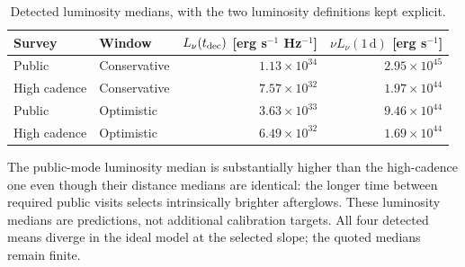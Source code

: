 \begin{table}[H]\centering\small
\renewcommand{\arraystretch}{1.15}
\caption{Detected luminosity medians, with the two luminosity definitions kept explicit.}
\begin{tabular}{@{}llrr@{}}
\toprule
Survey & Window & $L_\nu(t_{\rm dec})$ [erg s$^{-1}$ Hz$^{-1}$] & $\nu L_\nu(1\,\mathrm{d})$ [erg s$^{-1}$] \\\midrule
Public & Conservative & $1.13\times10^{34}$ & $2.95\times10^{45}$ \\
High cadence & Conservative & $7.57\times10^{32}$ & $1.97\times10^{44}$ \\
Public & Optimistic & $3.63\times10^{33}$ & $9.46\times10^{44}$ \\
High cadence & Optimistic & $6.49\times10^{32}$ & $1.69\times10^{44}$ \\
\bottomrule\end{tabular}\end{table}

The public-mode luminosity median is substantially higher than the high-cadence
one even though their distance medians are identical: the longer time between
required public visits selects intrinsically brighter afterglows. These
luminosity medians are predictions, not additional calibration targets.
All four detected means diverge in the ideal model at the selected slope;
the quoted medians remain finite.

